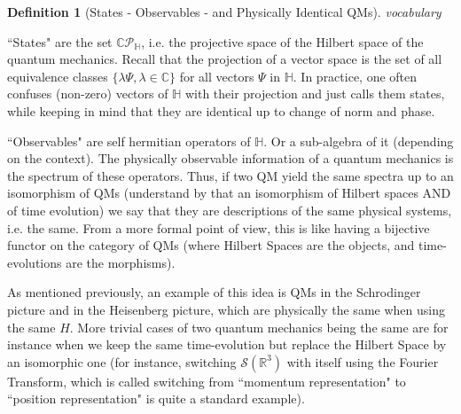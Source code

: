 \documentclass[a4paper,11pt]{article}
\numberwithin{equation}{section}
\theoremstyle{definition}
\newtheorem{definition}{Definition}
\begin{document}
\begin{definition}[States - Observables - and Physically Identical QMs] \emph{vocabulary}


``States" are the set $\mathbb{C}\mathcal{P}_\mathbb{H}$, i.e. the projective space of the Hilbert space of the quantum mechanics. Recall that the projection of a vector space is the set of all equivalence classes $\{\lambda \Psi, \lambda\in\mathbb{C}\}$ for all vectors $\Psi$ in $\mathbb{H}$. In practice, one often confuses (non-zero) vectors of $\mathbb{H}$ with their projection and just calls them states, while keeping in mind that they are identical up to change of norm and phase.

``Observables" are self hermitian operators of $\mathbb{H}$. Or a sub-algebra of it (depending on the context). The physically observable information of a quantum mechanics is the spectrum of these operators. Thus, if two QM yield the same spectra up to an isomorphism of QMs (understand by that an isomorphism of Hilbert spaces AND of time evolution) we say that they are descriptions of the same physical systems, i.e. the same. From a more formal point of view, this is like having a bijective functor on the category of QMs (where Hilbert Spaces are the objects, and time-evolutions are the morphisms).

As mentioned previously, an example of this idea is QMs in the Schrodinger picture and in the Heisenberg picture, which are physically the same when using the same $H$. More trivial cases of two quantum mechanics being the same are for instance when we keep the same time-evolution but replace the Hilbert Space by an isomorphic one (for instance, switching $\mathcal{S}(\mathbb{R}^3)$ with itself using the Fourier Transform, which is called switching from ``momentum representation" to ``position representation" is quite a standard example).    
\end{definition}
\end{document}
